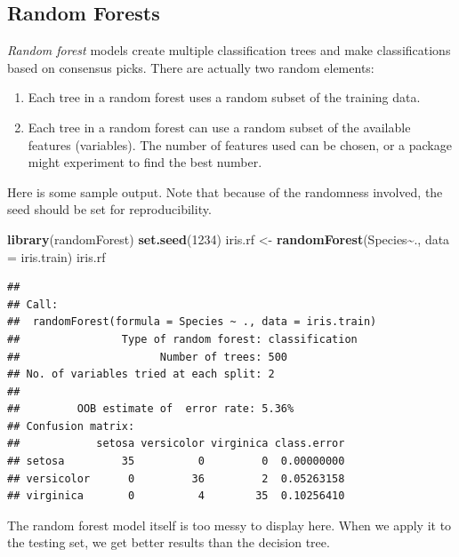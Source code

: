 \documentclass[
]{book}
\newenvironment{Shaded}{\begin{snugshade}}{\end{snugshade}}
\newcommand{\AttributeTok}[1]{\textcolor[rgb]{0.13,0.29,0.53}{#1}}
\newcommand{\DecValTok}[1]{\textcolor[rgb]{0.00,0.00,0.81}{#1}}
\newcommand{\FunctionTok}[1]{\textcolor[rgb]{0.13,0.29,0.53}{\textbf{#1}}}
\newcommand{\NormalTok}[1]{#1}
\newcommand{\OtherTok}[1]{\textcolor[rgb]{0.56,0.35,0.01}{#1}}
\newcommand{\SpecialCharTok}[1]{\textcolor[rgb]{0.81,0.36,0.00}{\textbf{#1}}}
\theoremstyle{definition}
\theoremstyle{definition}
\theoremstyle{definition}
\theoremstyle{definition}
\theoremstyle{remark}
\begin{document}
\subsection*{Random Forests}\label{random-forests}

\emph{Random forest} models create multiple classification trees and make classifications based on consensus picks. There are actually two random elements:

\begin{enumerate}
\def\labelenumi{\arabic{enumi}.}
\item
  Each tree in a random forest uses a random subset of the training data.
\item
  Each tree in a random forest can use a random subset of the available features (variables). The number of features used can be chosen, or a package might experiment to find the best number.
\end{enumerate}

Here is some sample output. Note that because of the randomness involved, the seed should be set for reproducibility.

\begin{Shaded}
\begin{Highlighting}[]
\FunctionTok{library}\NormalTok{(randomForest)}
\FunctionTok{set.seed}\NormalTok{(}\DecValTok{1234}\NormalTok{)}
\NormalTok{iris.rf }\OtherTok{\textless{}{-}} \FunctionTok{randomForest}\NormalTok{(Species}\SpecialCharTok{\textasciitilde{}}\NormalTok{., }\AttributeTok{data =}\NormalTok{ iris.train)}
\NormalTok{iris.rf}
\end{Highlighting}
\end{Shaded}

\begin{verbatim}
## 
## Call:
##  randomForest(formula = Species ~ ., data = iris.train) 
##                Type of random forest: classification
##                      Number of trees: 500
## No. of variables tried at each split: 2
## 
##         OOB estimate of  error rate: 5.36%
## Confusion matrix:
##            setosa versicolor virginica class.error
## setosa         35          0         0  0.00000000
## versicolor      0         36         2  0.05263158
## virginica       0          4        35  0.10256410
\end{verbatim}

The random forest model itself is too messy to display here. When we apply it to the testing set, we get better results than the decision tree.
\end{document}

